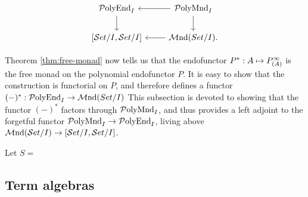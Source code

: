 \begin{displaymath}
  \begin{tikzcd}
    \PolyEnd_I \ar[d]
    &\PolyMnd_I \ar[l]\ar[d]\\
    \fun {\Set/I}{\Set/I}
    &\Mnd(Set/I). \ar[l]
  \end{tikzcd}
\end{displaymath}


Theorem \ref{thm:free-monad} now tells us that the endofunctor
$P^*:A\mapsto P_{(A)}^\moo$ is the free monad on the polynomial endofunctor $P$.
It is easy to show that the construction is functorial on $P$, and therefore
defines a functor $(-)^*:\PolyEnd_I\to\Mnd(Set/I)$
This subsection is devoted to showing that the functor $(-)^*$ factors through
$\PolyMnd_I$, and thus provides a left adjoint to the forgetful functor
$\PolyMnd_I\to\PolyEnd_I$, living above $\Mnd(\Set/I)\to[\Set/I,\Set/I]$. 

\begin{lemma}
    Let $S=$
\end{lemma}

\subsection{Term algebras}



